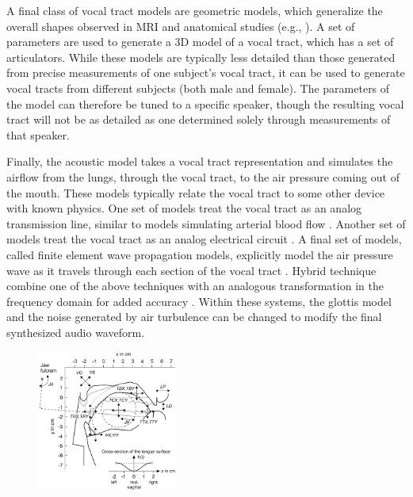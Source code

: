 \documentclass{article}
\begin{document}
A final class of vocal tract models
are geometric models,
which generalize the overall
shapes observed in
MRI and anatomical studies
(e.g., \citep{mermelstein1973}).
A set of parameters
are used to generate a 3D model
of a vocal tract,
which has a set of articulators.
While these models are typically
less detailed than those
generated from precise
measurements of one subject's vocal tract,
it can be used to generate vocal tracts
from different subjects
(both male and female).
The parameters of the model
can therefore be tuned to a specific speaker,
though the resulting vocal tract
will not be as detailed
as one determined solely through
measurements of that speaker.

Finally, the acoustic model takes
a vocal tract representation
and simulates the airflow from
the lungs, through the vocal tract,
to the air pressure coming out of the mouth.
These models typically relate
the vocal tract to some other
device with known physics.
One set of models treat the vocal tract
as an analog transmission line,
similar to models simulating
arterial blood flow \citep{meyer1989}.
Another set of models treat the vocal tract
as an analog electrical circuit
\citep{maeda1982}.
A final set of models,
called finite element wave propagation models,
explicitly model the air pressure wave
as it travels through each section
of the vocal tract \citep{elmasri1996}.
Hybrid technique combine one
of the above techniques
with an analogous transformation
in the frequency domain for added accuracy
\citep{sondhi1987}.
Within these systems, the glottis model
and the noise generated
by air turbulence can be changed
to modify the final synthesized audio waveform.

\clearpage

\begin{figure}
  \vspace{-30pt}
  \begin{center}
    \includegraphics[width=0.41\textwidth]{birholz-params}
  \end{center}
  \vspace{-24pt}
\end{figure}
\end{document}
